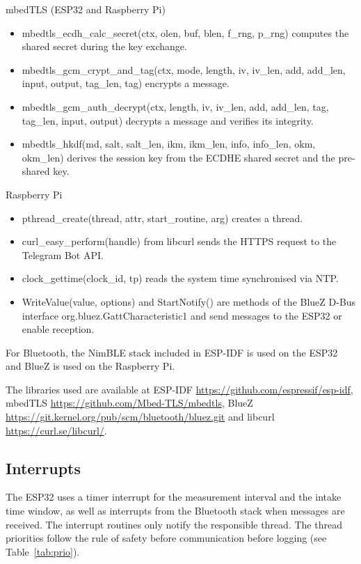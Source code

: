 mbedTLS (ESP32 and Raspberry Pi)
	\begin{itemize}
		\item mbedtls\_ecdh\_calc\_secret(ctx, olen, buf, blen, f\_rng, p\_rng)
		computes the shared secret during the key exchange.
		\item mbedtls\_gcm\_crypt\_and\_tag(ctx, mode, length, iv, iv\_len, add,
		add\_len, input, output, tag\_len, tag) encrypts a message.
		\item mbedtls\_gcm\_auth\_decrypt(ctx, length, iv, iv\_len, add, add\_len,
		tag, tag\_len, input, output) decrypts a message and verifies its
		integrity.
		\item mbedtls\_hkdf(md, salt, salt\_len, ikm, ikm\_len, info, info\_len,
		okm, okm\_len) derives the session key from the ECDHE shared secret
		and the pre-shared key.
	\end{itemize}

Raspberry Pi
	\begin{itemize}
		\item pthread\_create(thread, attr, start\_routine, arg) creates a
		thread.
		\item curl\_easy\_perform(handle) from libcurl sends the HTTPS request
		to the Telegram Bot API.
		\item clock\_gettime(clock\_id, tp) reads the system time synchronised
		via NTP.
		\item WriteValue(value, options) and StartNotify() are methods of the
		BlueZ D-Bus interface org.bluez.GattCharacteristic1 and send messages
		to the ESP32 or enable reception.
	\end{itemize}

For Bluetooth, the NimBLE stack included in ESP-IDF is used on the ESP32 and
BlueZ is used on the Raspberry Pi.

The libraries used are available at ESP-IDF
\url{https://github.com/espressif/esp-idf}, mbedTLS
\url{https://github.com/Mbed-TLS/mbedtls}, BlueZ
\url{https://git.kernel.org/pub/scm/bluetooth/bluez.git} and libcurl
\url{https://curl.se/libcurl/}.

\subsection{Interrupts}

The ESP32 uses a timer interrupt for the measurement interval and the intake
time window, as well as interrupts from the Bluetooth stack when messages are
received. The interrupt routines only notify the responsible thread. The
thread priorities follow the rule of safety before communication before
logging (see Table~\ref{tab:prio}).


